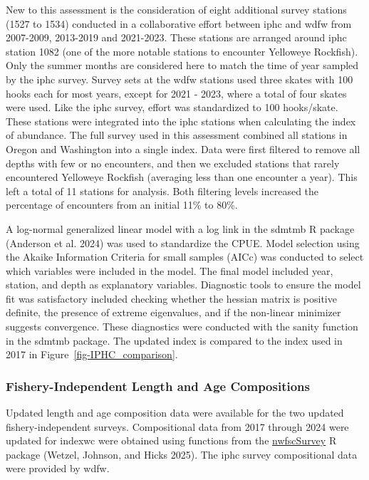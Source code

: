 \documentclass[
]{scrartcl}
\begin{document}
New to this assessment is the consideration of eight additional survey
stations (1527 to 1534) conducted in a collaborative effort between
\gls{iphc} and \gls{wdfw} from 2007-2009, 2013-2019 and 2021-2023. These
stations are arranged around \gls{iphc} station 1082 (one of the more
notable stations to encounter Yelloweye Rockfish). Only the summer
months are considered here to match the time of year sampled by the
\gls{iphc} survey. Survey sets at the \gls{wdfw} stations used three
skates with 100 hooks each for most years, except for 2021 - 2023, where
a total of four skates were used. Like the \gls{iphc} survey, effort was
standardized to 100 hooks/skate. These stations were integrated into the
\gls{iphc} stations when calculating the index of abundance. The full
survey used in this assessment combined all stations in Oregon and
Washington into a single index. Data were first filtered to remove all
depths with few or no encounters, and then we excluded stations that
rarely encountered Yelloweye Rockfish (averaging less than one encounter
a year). This left a total of 11 stations for analysis. Both filtering
levels increased the percentage of encounters from an initial 11\% to
80\%.

A log-normal generalized linear model with a log link in the
\gls{sdmtmb} R package (Anderson et al. 2024) was used to standardize
the CPUE. Model selection using the Akaike Information Criteria for
small samples (AICc) was conducted to select which variables were
included in the model. The final model included year, station, and depth
as explanatory variables. Diagnostic tools to ensure the model fit was
satisfactory included checking whether the hessian matrix is positive
definite, the presence of extreme eigenvalues, and if the non-linear
minimizer suggests convergence. These diagnostics were conducted with
the sanity function in the \gls{sdmtmb} package. The updated index is
compared to the index used in 2017 in Figure~\ref{fig-IPHC_comparison}.

\subsubsection{Fishery-Independent Length and Age
Compositions}\label{fishery-independent-length-and-age-compositions}

Updated length and age composition data were available for the two
updated fishery-independent surveys. Compositional data from 2017
through 2024 were updated for \gls{indexwc} were obtained using
functions from the
\href{https://github.com/pfmc-assessments/nwfscSurvey}{nwfscSurvey} R
package (Wetzel, Johnson, and Hicks 2025). The \gls{iphc} survey
compositional data were provided by \gls{wdfw}.
\end{document}

